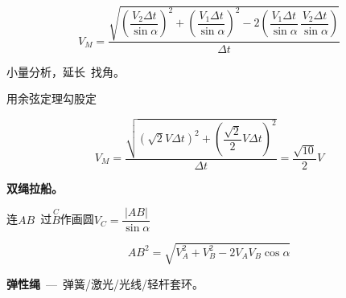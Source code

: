 \[
V_M=\frac{\sqrt{\left(\dfrac{V_2\Delta t}{\sin\alpha}\right)^{2}+\left(\dfrac{V_1\Delta t}{\sin\alpha}\right)^{2}-2\left(\dfrac{V_1\Delta t}{\sin\alpha}\,\dfrac{V_2\Delta t}{\sin\alpha}\right)}}{\Delta t}
\]%

小量分析，延长\ 找角。


\noindent 用余弦定理\quad 勾股定%

\[
V_M=\frac{\sqrt{\left(\sqrt2V\Delta t\right)^{2}+\left(\dfrac{\sqrt2}{2}V\Delta t\right)^{2}}}{\Delta t}=\frac{\sqrt{10}}{2}V
\]%

\textbf{双绳拉船。}

\noindent 连$AB$\ 过$\overset{C}{B}$作画圆\qquad $V_C=\dfrac{|AB|}{\sin\alpha}$%

\[
AB^{2}=\sqrt{V_A^{2}+V_B^{2}-2V_AV_B\cos\alpha}
\]%

\textbf{弹性绳}\ —\ 弹簧/激光/光线/轻杆套环。


